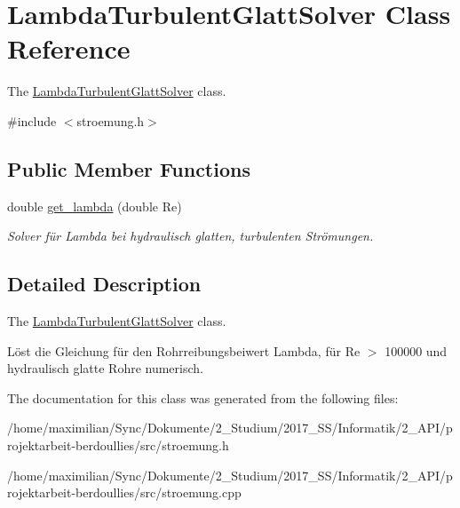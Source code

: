\hypertarget{class_lambda_turbulent_glatt_solver}{}\section{Lambda\+Turbulent\+Glatt\+Solver Class Reference}
\label{class_lambda_turbulent_glatt_solver}


The \hyperlink{class_lambda_turbulent_glatt_solver}{Lambda\+Turbulent\+Glatt\+Solver} class.  




{\ttfamily \#include $<$stroemung.\+h$>$}

\subsection*{Public Member Functions}
\begin{DoxyCompactItemize}
\item 
\mbox{\label{class_lambda_turbulent_glatt_solver_a1d20c44a3ae5472c67d7f0ba852ee558}} 
double \hyperlink{class_lambda_turbulent_glatt_solver_a1d20c44a3ae5472c67d7f0ba852ee558}{get\+\_\+lambda} (double Re)
\begin{DoxyCompactList}\small\item\em Solver für Lambda bei hydraulisch glatten, turbulenten Strömungen. \end{DoxyCompactList}\end{DoxyCompactItemize}


\subsection{Detailed Description}
The \hyperlink{class_lambda_turbulent_glatt_solver}{Lambda\+Turbulent\+Glatt\+Solver} class. 

Löst die Gleichung für den Rohrreibungsbeiwert Lambda, für Re $>$ 100000 und hydraulisch glatte Rohre numerisch. 

The documentation for this class was generated from the following files\+:\begin{DoxyCompactItemize}
\item 
/home/maximilian/\+Sync/\+Dokumente/2\+\_\+\+Studium/2017\+\_\+\+S\+S/\+Informatik/2\+\_\+\+A\+P\+I/projektarbeit-\/berdoullies/src/stroemung.\+h\item 
/home/maximilian/\+Sync/\+Dokumente/2\+\_\+\+Studium/2017\+\_\+\+S\+S/\+Informatik/2\+\_\+\+A\+P\+I/projektarbeit-\/berdoullies/src/stroemung.\+cpp\end{DoxyCompactItemize}
